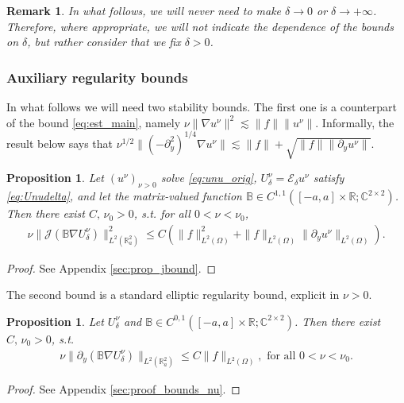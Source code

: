 \documentclass[report]{elsarticle}
\newtheorem{proposition}[theorem]{Proposition}
\newtheorem{remark}[theorem]{Remark}
\numberwithin{theorem}{section}
\renewcommand{\vec}[1]{\mathbf{#1}}
\begin{document}
\begin{remark}
	In what follows, we will never need to make $\delta\rightarrow 0$ or $\delta\rightarrow +\infty$. Therefore, where appropriate, we will not indicate the dependence of the bounds on $\delta$, but rather consider that we fix $\delta>0$.  
\end{remark}
\subsubsection{{Auxiliary regularity bounds}}
In what follows we will need two stability bounds. The first one is a counterpart of the bound \eqref{eq:est_main}, namely $\nu\|\nabla u^{\nu}\|^2\lesssim \|f\|\|u^{\nu}\|$.  Informally, the result below says that $\nu^{1/2}\|(-\partial_y^{2})^{1/4}\nabla u^{\nu}\|\lesssim \|f\|+\sqrt{\|f\|\|\partial_y u^{\nu}\|}$. 
\begin{proposition}
	\label{proposition:jbound}
	Let $(u^{\nu})_{\nu>0}$ solve \eqref{eq:unu_orig},  $U^{\nu}_{\delta}=\mathcal{E}_{\delta}u^{\nu}$ satisfy \eqref{eq:Unudelta}, and let the matrix-valued function $\mathbb{B}\in C^{1,1}([-a,a]\times \mathbb{R}; \mathbb{C}^{2\times 2})$. Then there exist  $C,\,\nu_0>0$, s.t. for all $0<\nu<\nu_0$, 
	\begin{align*}
		\nu\|\mathcal{J}(\mathbb{B}\nabla U^{\nu}_{\delta})\|^2_{L^2(\mathbb{R}^2_a)}\leq C\left( \|f\|^2_{L^2(\Omega)}+\|f\|_{L^2(\Omega)}\|\partial_y u^{\nu}\|_{L^2(\Omega)}\right).
	\end{align*}
\end{proposition}
\begin{proof}
	See Appendix \ref{sec:prop_jbound}. 
\end{proof}
The second bound is a standard elliptic regularity bound, explicit in $\nu>0$.  
\begin{proposition}
	\label{proposition:bounds_nu}
	Let $U^{\nu}_{\delta}$ and $\mathbb{B}\in C^{0,1}([-a,a]\times \mathbb{R};\mathbb{C}^{2\times 2})$. Then there exist  $C,\,\nu_0>0$, s.t.
	\begin{align}
		\label{eq:unubtmp}
		\nu\| \partial_y(\mathbb{B}\nabla U^{\nu}_{\delta})\|_{L^2(\mathbb{R}^2_a)}\leq  C \|f\|_{L^2(\Omega)}, \text{ for all }0<\nu<\nu_0.
	\end{align}
\end{proposition}
\begin{proof}
	See Appendix \ref{sec:proof_bounds_nu}.
\end{proof}
\end{document}
